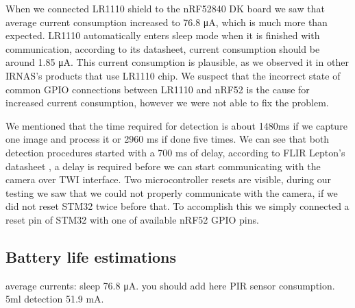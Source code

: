 When we connected LR1110 shield to the nRF52840 DK board we saw that average current consumption increased to 76.8 \si{\micro\ampere}, which is much more than expected.
LR1110 automatically enters sleep mode when it is finished with communication, according to its datasheet\cite{lr1110_datasheet}, current consumption should be around 1.85 \si{\micro\ampere}.
This current consumption is plausible, as we observed it in other IRNAS's products that use LR1110 chip.
We suspect that the incorrect state of common GPIO connections between LR1110 and nRF52 is the cause for increased current consumption, however we were not able to fix the problem.

We mentioned that the time required for detection is about 1480\si{\milli\second} if we capture one image and process it or 2960 \si{\milli\second} if done five times.
We can see that both detection procedures started with a 700 \si{\milli\second} of delay, according to FLIR Lepton's datasheet \cite{flir_datasheet}, a delay is required before we can start communicating with the camera over TWI interface.
Two microcontroller resets are visible, during our testing we saw that we could not properly communicate with the camera, if we did not reset STM32 twice before that.
To accomplish this we simply connected a reset pin of STM32 with one of available nRF52 GPIO pins.


\subsection{ Battery life estimations}


average currents:
sleep 76.8 \si{\micro\ampere}.  you should add here PIR sensor consumption.
5ml detection 51.9 \si{\milli\ampere}.

